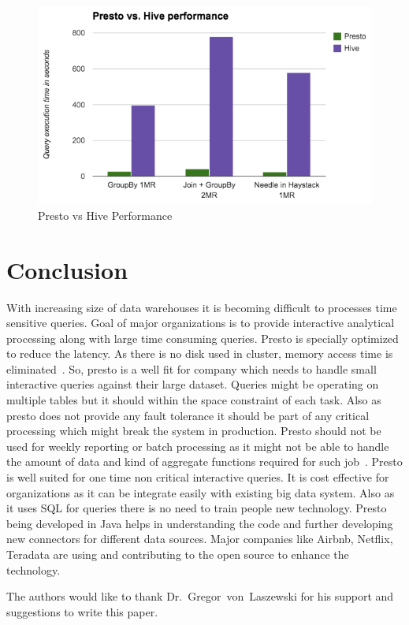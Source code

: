 \begin{figure}[!ht]
  \centering\includegraphics[width=\columnwidth]{image/presto-benchmark.png}
  \caption{Presto vs Hive Performance~\cite{hid-sp18-502-presto-usecase}}\label{f:benchmark}
\end{figure}


\section{Conclusion}
With increasing size of data warehouses it is becoming difficult to processes
time sensitive queries. Goal of major organizations is to provide
interactive analytical processing along with large time consuming queries.
Presto is specially optimized to reduce the latency. As there is no disk used in
 cluster, memory access time is eliminated~\cite{hid-sp18-502-presto-compare}.
 So, presto is a well fit for company which needs to handle small interactive
 queries against their large dataset. Queries might be operating on multiple
 tables but it should within the space constraint of each task. Also as presto
 does not provide any fault tolerance it should be part of any critical
 processing which might break the system in production. Presto should not be
 used for weekly reporting or batch processing as it might not be able to handle
 the amount of data and kind of aggregate functions required for such
 job~\cite{hid-sp18-502-presto-compare}.
Presto is well suited for one time non critical interactive queries. It is cost
effective for organizations as it can be integrate easily with existing big data
 system. Also as it uses SQL for queries there is no need to train people new
 technology. Presto being developed in Java helps in understanding the code and
 further developing new connectors for different data sources. Major companies
 like Airbnb, Netflix, Teradata are using and contributing to the open source to
 enhance the technology.

\begin{acks}

  The authors would like to thank Dr.~Gregor~von~Laszewski for his
  support and suggestions to write this paper.

\end{acks}


 

